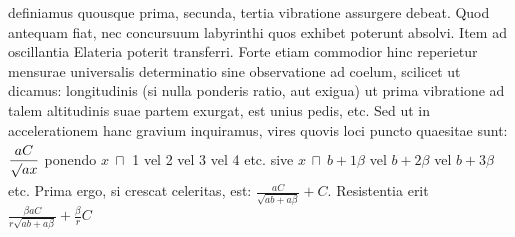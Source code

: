 definiamus quousque prima, secunda, tertia vibratione assurgere debeat.
Quod antequam fiat, nec concursuum labyrinthi quos exhibet  poterunt absolvi.
Item ad oscillantia Elateria\protect{} poterit transferri.
Forte etiam commodior hinc reperietur mensurae universalis determinatio sine
observatione ad coelum, scilicet ut dicamus:
longitudinis (si nulla ponderis ratio, aut exigua) ut prima vibratione ad talem altitudinis
suae partem exurgat, est unius pedis, etc.
\pend
\pstart
Sed ut in accelerationem hanc gravium\protect{} inquiramus,
vires\protect{} quovis loci puncto quaesitae sunt:
$\displaystyle \rule[-4mm]{0mm}{10mm} \frac{aC}{\sqrt{\vphantom{ax}}ax}$ ponendo $\displaystyle x \ \sqcap$
1 vel 2 vel 3 vel 4 etc. sive
$\displaystyle x \, \sqcap \ b + {\scriptstyle{1}} \beta$ vel $\displaystyle b + {\scriptstyle{2}} \beta$ vel $\displaystyle b + {\scriptstyle{3}} \beta$ etc. Prima ergo, si crescat celeritas, est: $\displaystyle \frac{aC}{\sqrt{ab + a \beta}} + C$. Resistentia erit $\displaystyle \frac{\beta a C}{r \sqrt{ab + a \beta}} + \frac{\beta}{r} C$

